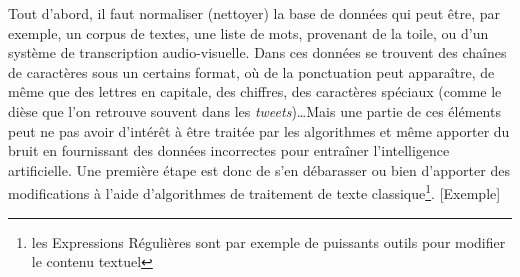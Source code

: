 \documentclass[12pt, french, twoside]{report}
\begin{document}
Tout d'abord, il faut normaliser (nettoyer) la base de données qui peut être, par exemple, un corpus de textes, une liste de mots, provenant de la toile, ou d'un système de transcription audio-visuelle. Dans ces données se trouvent des chaînes de caractères sous un certains format, où de la ponctuation peut apparaître, de même que des lettres en capitale, des chiffres, des caractères spéciaux (comme le dièse que l'on retrouve souvent dans les \textit{tweets})\dots Mais une partie de ces éléments peut ne pas avoir d'intérêt à être traitée par les algorithmes et même apporter du bruit en fournissant des données incorrectes pour entraîner l'intelligence artificielle. Une première étape est donc de s'en débarasser ou bien d'apporter des modifications à l'aide d'algorithmes de traitement de texte classique\footnote{les Expressions Régulières sont par exemple de puissants outils pour modifier le contenu textuel}.\cite{jurafsky_regular} [Exemple]\\
\end{document}

